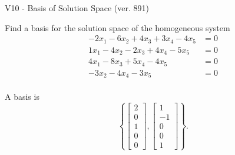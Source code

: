 \begin{exercise}
  \begin{exerciseTitle}V10 - Basis of Solution Space (ver. 891)\end{exerciseTitle}
  \begin{exerciseStatement}
    Find a basis for the solution space of the homogeneous system 
\begin{align*}
 -2 x_ 1 -6 x_ 2 + 4 x_ 3 + 3 x_ 4 -4 x_ 5 &= 0  \\ 
  1 x_ 1 -4 x_ 2 -2 x_ 3 + 4 x_ 4 -5 x_ 5 &= 0  \\ 
  4 x_ 1 -8 x_ 3 + 5 x_ 4 -4 x_ 5 &= 0  \\ 
  -3 x_ 2 -4 x_ 4 -3 x_ 5 &= 0  \\ 
 \end{align*}


 
  \end{exerciseStatement}

  \begin{exerciseAnswer}
   A basis is   
\[\left\{\left[\begin{array}{c}
2 \\
0 \\
1 \\
0 \\
0
\end{array}\right] , \left[\begin{array}{c}
1 \\
-1 \\
0 \\
0 \\
1
\end{array}\right]\right\}.\]

  


  \end{exerciseAnswer}
\end{exercise}